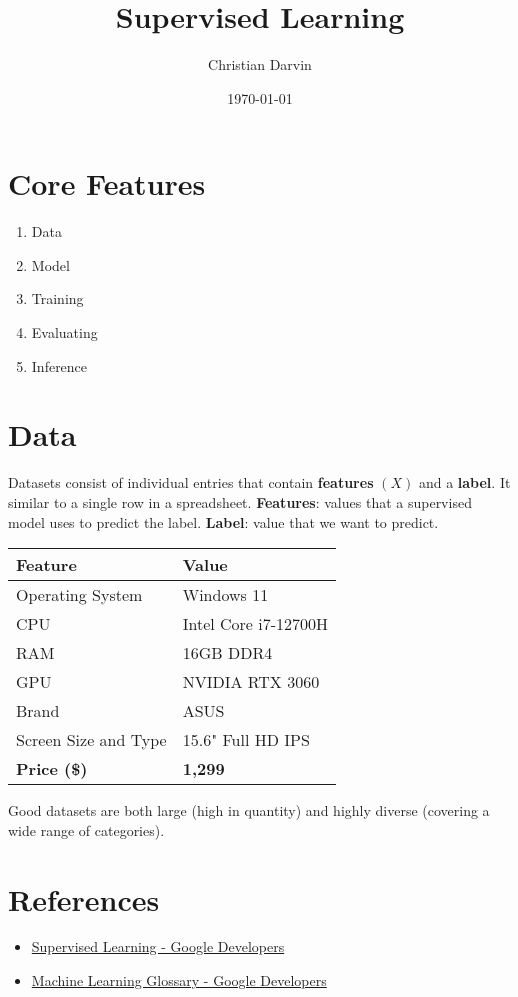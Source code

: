 \documentclass[a4paper,12pt]{article}
\title{Supervised Learning}
\author{Christian Darvin}
\date{\today}
\begin{document}
\maketitle
\section*{Core Features}
\begin{enumerate}
    \item Data
    \item Model
    \item Training
    \item Evaluating
    \item Inference
\end{enumerate}

\section*{Data}
Datasets consist of individual entries that contain \textbf{features} $(X)$ and a \textbf{label}. It similar to a single row in a spreadsheet. \newline
\textbf{Features}: values that a supervised model uses to predict the label. \newline
\textbf{Label}: value that we want to predict. \newline

\begin{center}
\begin{tabularx}{\textwidth}{@{}lX@{}}
\toprule
\textbf{Feature} & \textbf{Value} \\
\midrule
Operating System & Windows 11 \\
CPU & Intel Core i7-12700H \\
RAM & 16GB DDR4 \\
GPU & NVIDIA RTX 3060 \\
Brand & ASUS \\
Screen Size and Type & 15.6" Full HD IPS \\
\textbf{Price (\$)} & \textbf{1,299} \\
\bottomrule
\end{tabularx}
\end{center}

\noindent Good datasets are both large (high in quantity) and highly diverse (covering a wide range of categories).


\section*{References}
\begin{itemize}
    \item \href{https://developers.google.com/machine-learning/intro-to-ml/supervised}{Supervised Learning - Google Developers}
    \item \href{https://developers.google.com/machine-learning/glossary}{Machine Learning Glossary - Google Developers}
\end{itemize}
\end{document}
